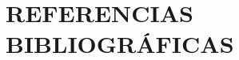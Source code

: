 
\begingroup
    \chapter{REFERENCIAS BIBLIOGRÁFICAS}
    \sloppy                                 %
    \nocite{*}
    \printbibliography[heading=none]
\endgroup